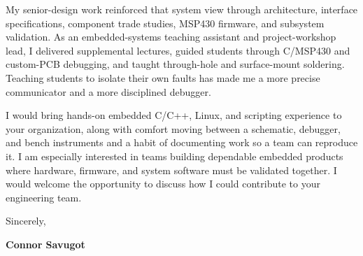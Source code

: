 \documentclass[10pt,letterpaper]{article}
\newcommand{\TargetCompany}{your organization}
\newcommand{\InterestSentence}{I am especially interested in teams building dependable embedded products where hardware, firmware, and system software must be validated together.}
\begin{document}
My senior-design work reinforced that system view through architecture, interface specifications, component trade studies, MSP430 firmware, and subsystem validation. As an embedded-systems teaching assistant and project-workshop lead, I delivered supplemental lectures, guided students through C/MSP430 and custom-PCB debugging, and taught through-hole and surface-mount soldering. Teaching students to isolate their own faults has made me a more precise communicator and a more disciplined debugger.

I would bring hands-on embedded C/C++, Linux, and scripting experience to \TargetCompany, along with comfort moving between a schematic, debugger, and bench instruments and a habit of documenting work so a team can reproduce it. \InterestSentence{} I would welcome the opportunity to discuss how I could contribute to your engineering team.

Sincerely,

\textbf{Connor Savugot}
\end{document}
